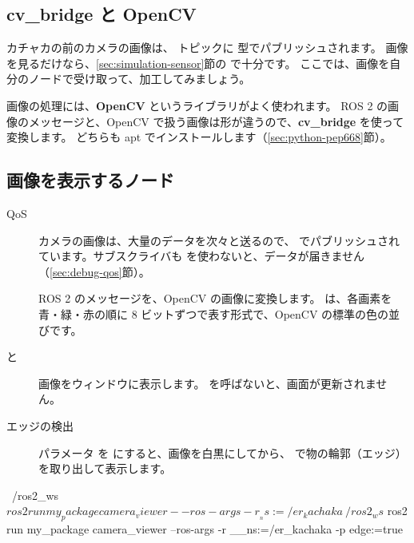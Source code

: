 \subsection{cv\_bridge と OpenCV}

カチャカの前のカメラの画像は、 トピックに  型でパブリッシュされます。
画像を見るだけなら、\ref{sec:simulation-sensor}節の  で十分です。
ここでは、画像を自分のノードで受け取って、加工してみましょう。

画像の処理には、\textbf{OpenCV} というライブラリがよく使われます。
ROS 2 の画像のメッセージと、OpenCV で扱う画像は形が違うので、\textbf{cv\_bridge} を使って変換します。
どちらも apt でインストールします（\ref{sec:python-pep668}節）。


\subsection{画像を表示するノード}


\begin{description}
  \item[QoS] カメラの画像は、大量のデータを次々と送るので、 でパブリッシュされています。サブスクライバも  を使わないと、データが届きません（\ref{sec:debug-qos}節）。
  \item[] ROS 2 のメッセージを、OpenCV の画像に変換します。 は、各画素を青・緑・赤の順に 8 ビットずつで表す形式で、OpenCV の標準の色の並びです。
  \item[ と ] 画像をウィンドウに表示します。 を呼ばないと、画面が更新されません。
  \item[エッジの検出] パラメータ  を  にすると、画像を白黒にしてから、 で物の輪郭（エッジ）を取り出して表示します。
\end{description}

\begin{terminal}[カメラの画像を表示する]
~/ros2_ws$ ros2 run my_package camera_viewer --ros-args -r __ns:=/er_kachaka
~/ros2_ws$ ros2 run my_package camera_viewer --ros-args -r __ns:=/er_kachaka -p edge:=true
\end{terminal}

